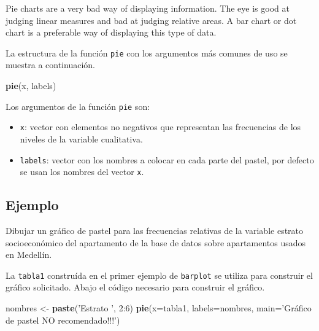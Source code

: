 \documentclass[10pt,]{krantz}
\makeatletter
\newenvironment{Shaded}{\begin{snugshade}}{\end{snugshade}}
\newcommand{\KeywordTok}[1]{\textcolor[rgb]{0.13,0.29,0.53}{\textbf{{#1}}}}
\newcommand{\DataTypeTok}[1]{\textcolor[rgb]{0.13,0.29,0.53}{{#1}}}
\newcommand{\DecValTok}[1]{\textcolor[rgb]{0.00,0.00,0.81}{{#1}}}
\newcommand{\StringTok}[1]{\textcolor[rgb]{0.31,0.60,0.02}{{#1}}}
\newcommand{\NormalTok}[1]{{#1}}
\providecommand{\tightlist}{%
  \setlength{\itemsep}{0pt}\setlength{\parskip}{0pt}}
\newenvironment{kframe}{%
\medskip{}
\setlength{\fboxsep}{.8em}
 \def\at@end@of@kframe{}%
 \ifinner\ifhmode%
  \def\at@end@of@kframe{\end{minipage}}%
  \begin{minipage}{\columnwidth}%
 \fi\fi%
 \def\FrameCommand##1{\hskip\@totalleftmargin \hskip-\fboxsep
 \colorbox{shadecolor}{##1}\hskip-\fboxsep
     \hskip-\linewidth \hskip-\@totalleftmargin \hskip\columnwidth}%
 \MakeFramed {\advance\hsize-\width
   \@totalleftmargin\z@ \linewidth\hsize
   \@setminipage}}%
 {\par\unskip\endMakeFramed%
 \at@end@of@kframe}
\renewenvironment{Shaded}{\begin{kframe}}{\end{kframe}}
\let\BeginKnitrBlock\begin \let\EndKnitrBlock\end
\makeatother
\begin{document}
\BeginKnitrBlock{rmdwarning}
Pie charts are a very bad way of displaying information. The eye is good
at judging linear measures and bad at judging relative areas. A bar
chart or dot chart is a preferable way of displaying this type of data.
\EndKnitrBlock{rmdwarning}

La estructura de la función \texttt{pie} con los argumentos más comunes
de uso se muestra a continuación.

\begin{Shaded}
\begin{Highlighting}[]
\KeywordTok{pie}\NormalTok{(x, labels)}
\end{Highlighting}
\end{Shaded}

Los argumentos de la función \texttt{pie} son:

\begin{itemize}
\tightlist
\item
  \texttt{x}: vector con elementos no negativos que representan las
  frecuencias de los niveles de la variable cualitativa.
\item
  \texttt{labels}: vector con los nombres a colocar en cada parte del
  pastel, por defecto se usan los nombres del vector \texttt{x}.
\end{itemize}

\subsection*{Ejemplo}\label{ejemplo-19}


Dibujar un gráfico de pastel para las frecuencias relativas de la
variable estrato socioeconómico del apartamento de la base de datos
sobre apartamentos usados en Medellín.

La \texttt{tabla1} construída en el primer ejemplo de \texttt{barplot}
se utiliza para construir el gráfico solicitado. Abajo el código
necesario para construir el gráfico.

\begin{Shaded}
\begin{Highlighting}[]
\NormalTok{nombres <-}\StringTok{ }\KeywordTok{paste}\NormalTok{(}\StringTok{'Estrato '}\NormalTok{, }\DecValTok{2}\NormalTok{:}\DecValTok{6}\NormalTok{)}
\KeywordTok{pie}\NormalTok{(}\DataTypeTok{x=}\NormalTok{tabla1, }\DataTypeTok{labels=}\NormalTok{nombres, }
    \DataTypeTok{main=}\StringTok{'Gráfico de pastel NO recomendado!!!'}\NormalTok{)}
\end{Highlighting}
\end{Shaded}
\end{document}
